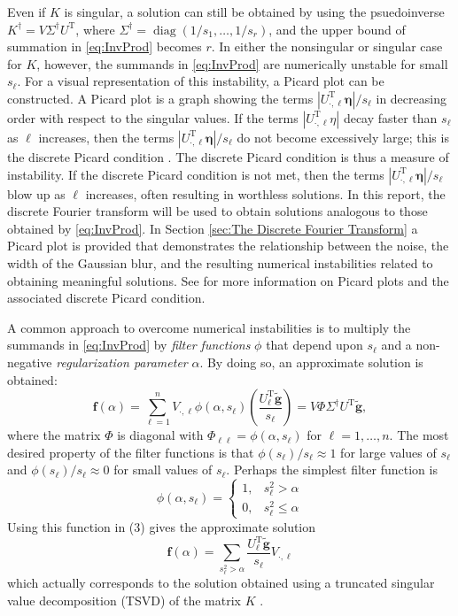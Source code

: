 \documentclass[12pt]{article}
\newcommand{\gnoiseVec}{\widetilde{\mathbf{g}}}	%
\newcommand{\kMat}{K}	%
\newcommand{\fVec}{\mathbf{f}}	%
\newcommand{\trans}{\mathrm{T}}	%
\DeclareMathOperator{\diag}{diag}	%
\newcommand{\regparam}{\alpha}
\newcommand{\filt}{\phi}
\newcommand{\noise}{\eta}	%
\newcommand{\noiseVec}{\bm{\noise}}	%
\newcommand{\singular}{s}	%
\begin{document}
Even if $\kMat$ is singular, a solution can still be obtained by using the psuedoinverse $\kMat^\dagger = V{\Sigma^\dagger}U^\trans$, where $\Sigma^\dagger = \diag(1/\singular_1,\ldots,1/\singular_r)$, and the upper bound of summation in \eqref{eq:InvProd} becomes $r$. In either the nonsingular or singular case for $\kMat$, however, the summands in \eqref{eq:InvProd} are numerically unstable for small $\singular_\ell$. For a visual representation of this instability, a Picard plot can be constructed. A Picard plot is a graph showing the terms $|U^\trans_{\cdot,\ell}\noiseVec|/\singular_\ell$ in decreasing order with respect to the singular values. If the terms $|U^\trans_{\cdot,\ell}\noise|$ decay faster than $\singular_\ell$ as $\ell$ increases, then the terms $|U^\trans_{\cdot,\ell}\noiseVec|/\singular_\ell$ do not become excessively large; this is the discrete Picard condition \cite{ABT}. The discrete Picard condition is thus a measure of instability. If the discrete Picard condition is not met, then the terms $|U^\trans_{\cdot,\ell}\noiseVec|/\singular_\ell$ blow up as $\ell$ increases, often resulting in worthless solutions. In this report, the discrete Fourier transform will be used to obtain solutions analogous to those obtained by \eqref{eq:InvProd}. In Section \ref{sec:The Discrete Fourier Transform} a Picard plot is provided that demonstrates the relationship between the noise, the width of the Gaussian blur, and the resulting numerical instabilities related to obtaining meaningful solutions. See \cite{Hansen1990} for more information on Picard plots and the associated discrete Picard condition. \par 
A common approach to overcome numerical instabilities is to multiply the summands in \eqref{eq:InvProd} by \textit{filter functions} $\filt$ that depend upon $\singular_\ell$ and a non-negative \textit{regularization parameter} $\regparam$. By doing so, an approximate solution is obtained:
\begin{equation}
\fVec(\regparam) = \sum_{\ell = 1}^n V_{\cdot,\ell}\filt(\regparam,\singular_\ell)\left(\frac{{U^\trans_\ell}\gnoiseVec}{\singular_\ell}\right) = V\Phi\Sigma^\dagger U^\trans\gnoiseVec,
\label{eq:ApproxSol}
\end{equation}
where the matrix $\Phi$ is diagonal with $\Phi_{\ell\ell} = \filt(\regparam,\singular_\ell)$ for $\ell = 1,\ldots,n$. The most desired property of the filter functions is that $\filt(\singular_\ell)/\singular_\ell \approx 1$  for large values of $\singular_\ell$ and $\filt(\singular_\ell)/\singular_\ell \approx 0$ for small values of $\singular_\ell$.  Perhaps the simplest filter function is
\[\filt(\regparam,\singular_\ell) = \begin{cases}
1, & \singular_\ell^2 > \regparam \\
0, & \singular_\ell^2 \leq \regparam
\end{cases}\]
Using this function in (3) gives the approximate solution
\[\fVec(\regparam) = \sum_{\singular_\ell^2 > \regparam} \frac{{U^\trans_\ell}\gnoiseVec}{\singular_\ell}V_{\cdot,\ell}\]
which actually corresponds to the solution obtained using a truncated singular value decomposition (TSVD) of the matrix $\kMat$ \cite{Vogel:2002}. \par
\end{document}
